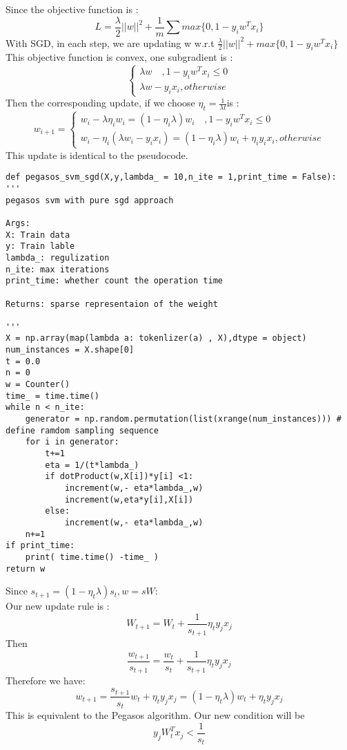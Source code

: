 \documentclass{article}
\newenvironment{problem}[2][$\bullet$]{\begin{trivlist}\large
		\item[\hskip \labelsep {\bfseries #1}\hskip \labelsep {\bfseries #2.}]}  {\end{trivlist}}
\begin{document}
\begin{problem}{3.1}
\end{problem}
Since the objective function is :
$$L = \frac{\lambda}{2} ||w||^2 + \frac{1}{m} \sum max\{0,1-y_iw^Tx_i\}$$
With SGD, in each step, we are updating w w.r.t $\frac{\lambda}{2} ||w||^2 + max\{0,1-y_iw^Tx_i\}$\\
This objective function is convex, one subgradient is :
$$\begin{cases}
\lambda w \quad ,1 -y_iw^Tx_i \leq 0\\
\lambda w-y_ix_i , otherwise
\end{cases}$$
Then the corresponding update, if we choose $\eta_t = \frac{1}{\lambda t} $is :
$$w_{i+1} = \begin{cases}
 w_{i} -\lambda \eta_i w_i = (1 - \eta_i \lambda)w_i \quad ,1 -y_iw^Tx_i \leq 0\\
w_i - \eta_i ( \lambda w_i-y_ix_i ) = (1- \eta_i\lambda)w_i + \eta_iy_ix_i, otherwise
\end{cases}$$
This update is identical to the pseudocode. \\

\begin{problem}{3.2}
\end{problem}
\begin{verbatim}
def pegasos_svm_sgd(X,y,lambda_ = 10,n_ite = 1,print_time = False):
'''
pegasos svm with pure sgd approach

Args:
X: Train data
y: Train lable
lambda_: regulization
n_ite: max iterations
print_time: whether count the operation time

Returns: sparse representaion of the weight

'''
X = np.array(map(lambda a: tokenlizer(a) , X),dtype = object)
num_instances = X.shape[0]
t = 0.0
n = 0
w = Counter()
time_ = time.time()
while n < n_ite:
	generator = np.random.permutation(list(xrange(num_instances))) # define ramdom sampling sequence
	for i in generator:
		t+=1
		eta = 1/(t*lambda_)
		if dotProduct(w,X[i])*y[i] <1:
			increment(w,- eta*lambda_,w)
			increment(w,eta*y[i],X[i])
		else:
			increment(w,- eta*lambda_,w)
	n+=1
if print_time:
	print( time.time() -time_ )
return w
\end{verbatim}

\begin{problem}{3.3}
\end{problem}
Since $s_{t+1} = (1-\eta_t \lambda)s_t, w= sW$:\\
Our new update rule is :
$$W_{t+1} = W_t + \frac{1}{s_{t+1}}\eta_t y_jx_j$$ Then
$$\frac{w_{t+1}}{s_{t+1}} =\frac{w_t}{s_t}  + \frac{1}{s_{t+1}}\eta_t y_jx_j $$
Therefore we have:
$$w_{t+1} = \frac{s_{t+1}}{s_t}w_t + \eta_ty_jx_j =(1-\eta_t \lambda)w_t + \eta_ty_jx_j $$
This is equivalent to the Pegasos algorithm. 
Our new condition will be $$y_jW_t^Tx_j < \frac{1}{s_t}$$\\
\end{document}
